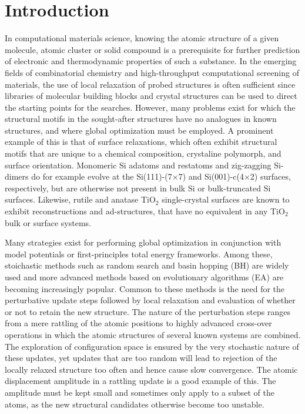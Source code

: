 \documentclass[aip,amsmath,amssymb,reprint]{revtex4-1}
\begin{document}
\section{\label{sec:introduction}Introduction}
In computational materials science, knowing the atomic structure of a
given molecule, atomic cluster or solid compound is a prerequisite for
further prediction of electronic and thermodynamic properties of such
a substance. In the emerging fields of combinatorial chemistry and
high-throughput computational screening of materials,\cite{curtarolo2013} the use of local
relaxation of probed structures is often sufficient since libraries of
molecular building blocks and crystal structures can be used to direct
the starting points for the searches.\cite{hafner2006} However, many problems exist for
which the structural motifs in the sought-after structures have no
analogues in known structures, and where global optimization must be
employed. A prominent example of this is that of surface relaxations,
which often exhibit structural motifs that are unique to a chemical
composition, crystaline polymorph, and surface orientation. Monomeric
Si adatoms and restatoms and zig-zagging Si-dimers do for example evolve at the
Si(111)-(7$\times$7) and Si(001)-c(4$\times$2) surfaces,\cite{si7x7,si4x2} respectively, but
are otherwise not present in bulk Si or bulk-truncated Si surfaces. Likewise,
rutile and anatase TiO$_2$ single-crystal surfaces are known to exhibit
reconstructions and ad-structures,\cite{anatase1,anatase2,rutile1,rutile2} that have no equivalent in any TiO$_2$ bulk or surface systems.

Many strategies exist for performing global optimization in
conjunction with model potentials or first-principles total energy
frameworks. Among these, stoichastic methods such as random search\cite{pickard2011} and
basin hopping (BH)\cite{wales1997} are widely used and more advanced methods based on
evolutionary algorithms (EA) are becoming increasingly popular.\cite{johnston2003} Common
to these methods is the need for the perturbative update steps
followed by local relaxation and evaluation of whether or not to
retain the new structure. The nature of the perturbation steps ranges
from a mere rattling of the atomic positions to highly advanced
cross-over operations in which the atomic structures of several known
systems are combined.\cite{ho1995} The exploration of configuration space is
ensured by the very stochastic nature of these updates,\cite{mathias2018} yet updates
that are too random will lead to rejection of the locally
relaxed structure too often and hence cause slow convergence. The atomic
displacement amplitude in a rattling update is a good example of
this. The amplitude must be kept small and sometimes only apply to a
subset of the atoms, as the new structural candidates otherwise become
too unstable.
\end{document}
